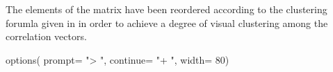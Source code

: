 The elements of the matrix have been reordered according to the
clustering forumla given in \citet[sec. 6.2.3]{Sarkar2008} in order to
achieve a degree of visual clustering among the correlation vectors.

\begin{Schunk}
\begin{Sinput}
 options( prompt= "> ", continue= "+ ", width= 80)
\end{Sinput}
\end{Schunk}


